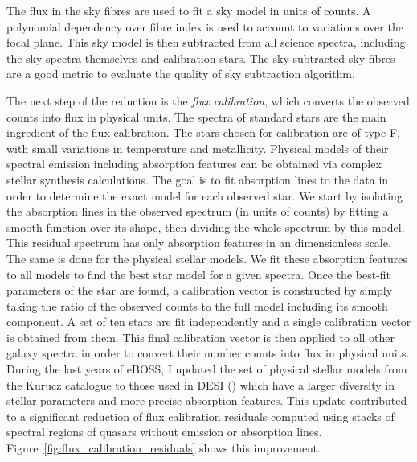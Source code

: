 The flux in the sky fibres are used to fit a sky model in units of counts.
A polynomial dependency over fibre index is used to account to variations 
over the focal plane. This sky model is then subtracted from all science 
spectra, including the sky spectra themselves and calibration stars. 
The sky-subtracted sky fibres are a good metric to evaluate the quality of 
sky subtraction algorithm. 

The next step of the reduction is the \emph{flux calibration}, 
which converts the observed counts into flux in physical units. 
The spectra of standard stars are the main ingredient of the flux calibration. 
The stars chosen for calibration are of type F, with small variations in 
temperature and metallicity. Physical models of their spectral emission 
including absorption features can be obtained via complex stellar synthesis calculations. 
The goal is to fit absorption lines to the data 
in order to determine the exact model for each observed star. 
We start by isolating the absorption lines in the observed spectrum 
(in units of counts) by fitting a smooth function over its shape, 
then dividing the whole spectrum by this model. 
This residual spectrum has only absorption features in an dimensionless scale.
The same is done for the physical stellar models. We fit these absorption features 
to all models to find the best star model for a given spectra.
Once the best-fit parameters of the star are found, 
a calibration vector is constructed by simply taking the ratio of 
the observed counts to the full model including its smooth component. 
A set of ten stars are fit independently and a single calibration 
vector is obtained from them. This final calibration vector is then 
applied to all other galaxy spectra in order to convert their number counts into
flux in physical units. During the last years of eBOSS, I updated 
the set of physical stellar models from the Kurucz catalogue to those used 
in DESI (\cite{allendeprietoCollectionModelStellar2018}) 
which have a larger diversity in stellar 
parameters and more precise absorption features. This update contributed
to a significant reduction of flux calibration residuals 
computed using stacks of spectral regions of quasars without emission 
or absorption lines. Figure~\ref{fig:flux_calibration_residuals} shows this 
improvement. 

